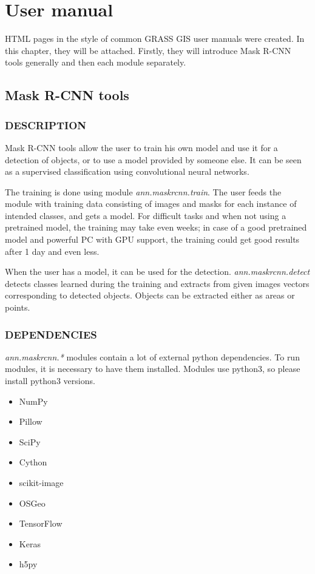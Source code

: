 \chapter{User manual}
\label{manual}

HTML pages in the style of common GRASS GIS user manuals were created. In this
chapter, they will be attached. Firstly, they will introduce Mask R-CNN tools
generally and then each module separately.

\section{Mask R-CNN tools}

\subsection*{DESCRIPTION}

Mask R-CNN tools allow the user to train his own model and use it for a 
detection of objects, or to use a model provided by someone else. It can be seen 
as a supervised classification using convolutional neural networks.

The training is done using module \emph{ann.maskrcnn.train}. The user feeds the 
module with training data consisting of images and masks for each instance of 
intended classes, and gets a model. For difficult tasks and when not using a 
pretrained model, the training may take even weeks; in case of a good pretrained 
model and powerful PC with GPU support, the training could get good results 
after 1 day and even less.

When the user has a model, it can be used for the detection. 
\emph{ann.maskrcnn.detect} detects classes learned during the training and 
extracts from given images vectors corresponding to detected objects. Objects 
can be extracted either as areas or points. 

\subsection*{DEPENDENCIES}

\emph{ann.maskrcnn.*} modules contain a lot of external python dependencies.
To run modules, it is necessary to have them installed. Modules use python3, so
please install python3 versions.

\liststyleLi
\begin{itemize}
\item NumPy
\item Pillow
\item SciPy
\item Cython
\item scikit-image
\item OSGeo
\item TensorFlow
\item Keras
\item h5py
\end{itemize}

